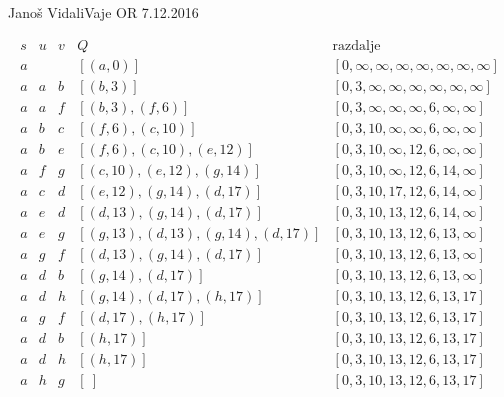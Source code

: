 \begin{naloga}{Janoš Vidali}{Vaje OR 7.12.2016}
\begin{odgovor}
\begin{tabela}
$$
\begin{array}{c|c|c|c|c}
s & u & v & Q & \text{razdalje} \\ \hline
a &   &   & [(a,0)]  & [0, \infty, \infty, \infty, \infty, \infty, \infty, \infty] \\
a & a  &  b & [(b, 3)]  & [0, 3, \infty, \infty, \infty, \infty, \infty, \infty] \\
a & a  &  f & [(b, 3), (f, 6)]  & [0, 3, \infty, \infty, \infty, 6, \infty, \infty] \\
a & b  & c & [(f, 6), (c, 10)]  & [0, 3, 10, \infty, \infty, 6, \infty, \infty] \\
a & b  & e & [(f, 6), (c, 10), (e, 12)]  & [0, 3, 10, \infty, 12, 6, \infty, \infty] \\
a & f  & g & [(c, 10), (e, 12), (g, 14)]  & [0, 3, 10, \infty, 12, 6, 14, \infty] \\
a & c  & d & [(e, 12), (g, 14), (d, 17)]  & [0, 3, 10, 17, 12, 6, 14, \infty] \\
a & e  & d & [(d, 13), (g, 14), (d, 17)]  & [0, 3, 10, 13, 12, 6, 14, \infty] \\
a & e  & g & [(g, 13), (d, 13), (g, 14), (d, 17)]  & [0, 3, 10, 13, 12, 6, 13, \infty] \\
a & g  & f & [(d, 13), (g, 14), (d, 17)]  & [0, 3, 10, 13, 12, 6, 13, \infty] \\
a & d  & b & [(g, 14), (d, 17)]  & [0, 3, 10, 13, 12, 6, 13, \infty] \\
a & d  & h & [(g, 14), (d, 17), (h, 17)]  & [0, 3, 10, 13, 12, 6, 13, 17] \\
a & g  & f & [(d, 17), (h, 17)]  & [0, 3, 10, 13, 12, 6, 13, 17] \\
a & d & b & [(h, 17)]  & [0, 3, 10, 13, 12, 6, 13, 17] \\
a & d & h & [(h, 17)]  & [0, 3, 10, 13, 12, 6, 13, 17] \\
a & h & g & [\ ]  & [0, 3, 10, 13, 12, 6, 13, 17] \\

\end{array}
$$
\end{tabela}


\end{odgovor}
\end{naloga}
